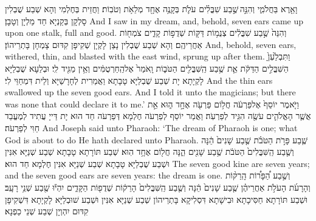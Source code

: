 {וָאֵ֖רֶא בַּחֲלֹמִ֑י וְהִנֵּ֣ה \legarmeh  שֶׁ֣בַע שִׁבֳּלִ֗ים עֹלֹ֛ת בְּקָנֶ֥ה אֶחָ֖ד מְלֵאֹ֥ת וְטֹבֽוֹת׃}
{וַחֲזֵית בְּחֶלְמִי וְהָא שְׁבַע שֻׁבְלִין סָלְקָן בְּקַנְיָא חַד מַלְיָן וְטָבָן׃}
{And I saw in my dream, and, behold, seven ears came up upon one stalk, full and good.}{}
{וְהִנֵּה֙ שֶׁ֣בַע שִׁבֳּלִ֔ים צְנֻמ֥וֹת דַּקּ֖וֹת שְׁדֻפ֣וֹת קָדִ֑ים צֹמְח֖וֹת אַחֲרֵיהֶֽם׃}
{וְהָא שְׁבַע שֻׁבְלִין נָצַן לָקְיָן שְׁקִיפָן קִדּוּם צָמְחָן בָּתְרֵיהוֹן׃}
{And, behold, seven ears, withered, thin, and blasted with the east wind, sprung up after them.}{}
{וַתִּבְלַ֙עְןָ֙ הַשִּׁבֳּלִ֣ים הַדַּקֹּ֔ת אֵ֛ת שֶׁ֥בַע הַֽשִּׁבֳּלִ֖ים הַטֹּב֑וֹת וָֽאֹמַר֙ אֶל\maqqaf הַֽחַרְטֻמִּ֔ים וְאֵ֥ין מַגִּ֖יד לִֽי׃}
{וּבְלַעָא שֻׁבְלַיָּא לָקְיָתָא יָת שְׁבַע שֻׁבְלַיָּא טָבָתָא וַאֲמַרִית לְחָרָשַׁיָּא וְלֵית דִּמְחַוֵּי לִי׃}
{And the thin ears swallowed up the seven good ears. And I told it unto the magicians; but there was none that could declare it to me.’}{}
{וַיֹּ֤אמֶר יוֹסֵף֙ אֶל\maqqaf פַּרְעֹ֔ה חֲל֥וֹם פַּרְעֹ֖ה אֶחָ֣ד ה֑וּא אֵ֣ת אֲשֶׁ֧ר הָאֱלֹהִ֛ים עֹשֶׂ֖ה הִגִּ֥יד לְפַרְעֹֽה׃}
{וַאֲמַר יוֹסֵף לְפַרְעֹה חֶלְמָא דְּפַרְעֹה חַד הוּא יָת דַּייָ עֲתִיד לְמֶעֱבַד חַוִּי לְפַרְעֹה׃}
{And Joseph said unto Pharaoh: ‘The dream of Pharaoh is one; what God is about to do He hath declared unto Pharaoh.}{}
{שֶׁ֧בַע פָּרֹ֣ת הַטֹּבֹ֗ת שֶׁ֤בַע שָׁנִים֙ הֵ֔נָּה וְשֶׁ֤בַע הַֽשִּׁבֳּלִים֙ הַטֹּבֹ֔ת שֶׁ֥בַע שָׁנִ֖ים הֵ֑נָּה חֲל֖וֹם אֶחָ֥ד הֽוּא׃}
{שְׁבַע תּוֹרָתָא טָבָתָא שְׁבַע שְׁנַיָּא אִנִּין וּשְׁבַע שֻׁבְלַיָּא טָבָתָא שְׁבַע שְׁנַיָּא אִנִּין חֶלְמָא חַד הוּא׃}
{The seven good kine are seven years; and the seven good ears are seven years: the dream is one.}{}
{וְשֶׁ֣בַע הַ֠פָּר֠וֹת הָֽרַקּ֨וֹת וְהָרָעֹ֜ת הָעֹלֹ֣ת אַחֲרֵיהֶ֗ן שֶׁ֤בַע שָׁנִים֙ הֵ֔נָּה וְשֶׁ֤בַע הַֽשִּׁבֳּלִים֙ הָרֵק֔וֹת שְׁדֻפ֖וֹת הַקָּדִ֑ים יִהְי֕וּ שֶׁ֖בַע שְׁנֵ֥י רָעָֽב׃}
{וּשְׁבַע תּוֹרָתָא חַסִּיכָתָא וּבִישָׁתָא דִּסְלִיקָא בָּתְרֵיהוֹן שְׁבַע שְׁנַיָּא אִנִּין וּשְׁבַע שׁוּבְלַיָּא לָקְיָתָא דִּשְׁקִיפָן קִדּוּם יִהְוְיָן שְׁבַע שְׁנֵי כַפְנָא׃}

